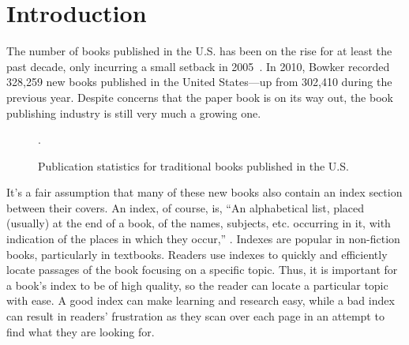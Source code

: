 \section{Introduction}

The number of books published in the U.S. has been on the rise for at least the past decade, only incurring a small setback in 2005~\cite{bowker}.
In 2010, Bowker recorded 328,259 new books published in the United States---up from 302,410 during the previous year.
Despite concerns that the paper book is on its way out, the book publishing industry is still very much a growing one.

\begin{figure}
\begin{center}
\label{fig:new-books}
\caption{Publication statistics for traditional books published in the U.S.\cite{bowker}}.
\end{center}
\end{figure}

It's a fair assumption that many of these new books also contain an index section between their covers.
An index, of course, is, ``An alphabetical list, placed (usually) at the end of a book, of the names, subjects, etc. occurring in it, with indication of the places in which they occur,'' \cite{oed-index}.
Indexes are popular in non-fiction books, particularly in textbooks.
Readers use indexes to quickly and efficiently locate passages of the book focusing on a specific topic.
Thus, it is important for a book's index to be of high quality, so the reader can locate a particular topic with ease.
A good index can make learning and research easy, while a bad index can result in readers' frustration as they scan over each page in an attempt to find what they are looking for.

